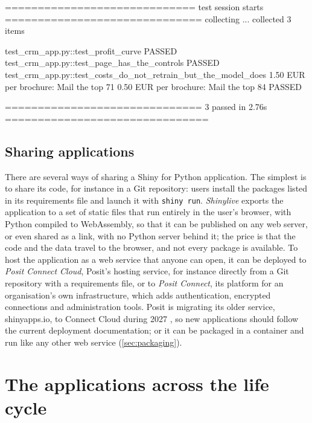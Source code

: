 \begin{pyoutput}
============================= test session starts ==============================
collecting ... collected 3 items

test_crm_app.py::test_profit_curve PASSED
test_crm_app.py::test_page_has_the_controls PASSED
test_crm_app.py::test_costs_do_not_retrain_but_the_model_does 
  1.50 EUR per brochure: Mail the top 71%
  0.50 EUR per brochure: Mail the top 84%
PASSED

============================== 3 passed in 2.76s ===============================
\end{pyoutput}

\subsection{Sharing applications}

There are several ways of sharing a Shiny for Python application. The simplest is to share its code, for instance in a Git
repository: users install the packages listed in its requirements file and launch it with \texttt{shiny run}. \emph{Shinylive}
exports the application to a set of static files that run entirely in the user's browser, with Python compiled to
WebAssembly, so that it can be published on any web server, or even shared as a link, with no Python server behind it; the price is
that the code and the data travel to the browser, and not every package is available. To host the application as a web service that
anyone can open, it can be deployed to \emph{Posit Connect Cloud}, Posit's hosting service, for instance
directly from a Git repository with a requirements file, or to \emph{Posit Connect}, its platform for an organisation's
own infrastructure, which adds authentication, encrypted connections and administration tools. Posit is migrating
its older service, shinyapps.io, to Connect Cloud during 2027 \citep{posit2026connectcloud}, so new applications should
follow the current deployment documentation; or it can be packaged in a container and run like any other web service (\cref{sec:packaging}).

\section{The applications across the life cycle}\label{sec:applifecycle}

